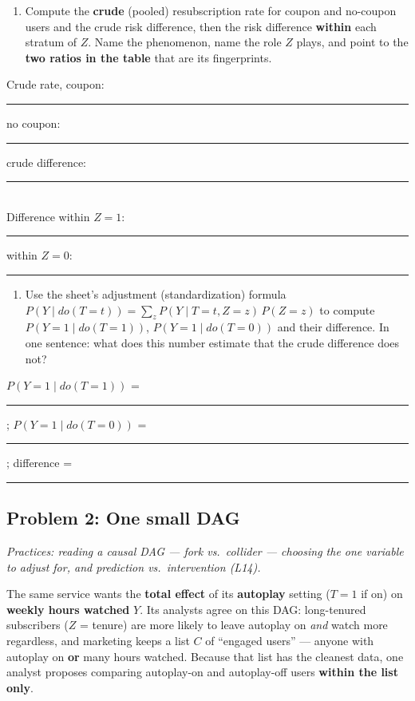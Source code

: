 \documentclass[
  11pt,
]{article}
\providecommand{\tightlist}{%
  \setlength{\itemsep}{0pt}\setlength{\parskip}{0pt}}
\newcommand{\answerspace}[1]{\par\vspace*{#1}}  %
\newcommand{\blank}[1][1.2in]{\rule{#1}{0.4pt}}
\newcommand{\answerpage}{\clearpage}
\begin{document}
\begin{enumerate}
\def\labelenumi{(\alph{enumi})}
\tightlist
\item
  Compute the \textbf{crude} (pooled) resubscription rate for coupon and
  no-coupon users and the crude risk difference, then the risk
  difference \textbf{within} each stratum of \(Z\). Name the phenomenon,
  name the role \(Z\) plays, and point to the \textbf{two ratios in the
  table} that are its fingerprints.
\end{enumerate}

Crude rate, coupon: \blank[0.7in]\quad no coupon:
\blank[0.7in]\quad crude difference: \blank[0.7in]\\
Difference within \(Z{=}1\): \blank[0.7in]\quad within \(Z{=}0\):
\blank[0.7in]\answerspace{0.7in}

\begin{enumerate}
\def\labelenumi{(\alph{enumi})}
\setcounter{enumi}{1}
\tightlist
\item
  Use the sheet's adjustment (standardization) formula
  \(P(Y\mid do(T{=}t)) = \sum_z P(Y\mid T{=}t, Z{=}z)\,P(Z{=}z)\) to
  compute \(P(Y{=}1\mid do(T{=}1))\), \(P(Y{=}1\mid do(T{=}0))\) and
  their difference. In one sentence: what does this number estimate that
  the crude difference does not?
\end{enumerate}

\(P(Y{=}1\mid do(T{=}1))\) = \blank[0.6in]; \(P(Y{=}1\mid do(T{=}0))\) =
\blank[0.6in]; difference = \blank[0.6in]\answerspace{0.6in}

\answerpage

\subsection{Problem 2: One small DAG}\label{problem-2-one-small-dag}

\emph{Practices: reading a causal DAG --- fork vs.~collider --- choosing
the one variable to adjust for, and prediction vs.~intervention (L14).}

The same service wants the \textbf{total effect} of its
\textbf{autoplay} setting (\(T=1\) if on) on \textbf{weekly hours
watched} \(Y\). Its analysts agree on this DAG: long-tenured subscribers
(\(Z\) = tenure) are more likely to leave autoplay on \emph{and} watch
more regardless, and marketing keeps a list \(C\) of ``engaged users''
--- anyone with autoplay on \textbf{or} many hours watched. Because that
list has the cleanest data, one analyst proposes comparing autoplay-on
and autoplay-off users \textbf{within the list only}.
\end{document}
